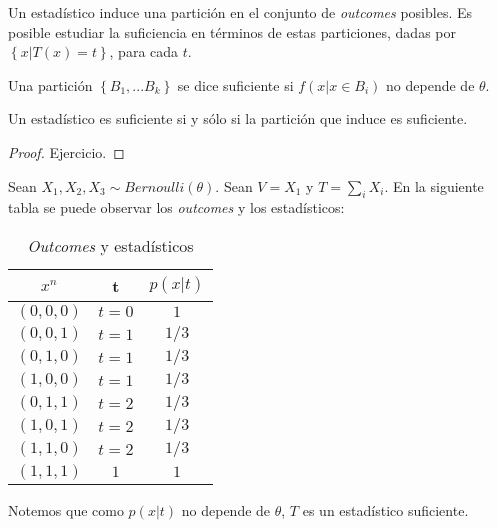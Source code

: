 Un estadístico induce una partición en el conjunto de \emph{outcomes}  posibles. Es posible estudiar la suficiencia en términos de estas particiones, dadas por $\left \{ x | T(x) = t \right  \}$, para cada $ t $. 

\begin{definition}
    Una partición $ \left \{ B_1,...B_k \right \}$ se dice suficiente si $f(x | x \in B_i) $ no depende de $\theta$. 
\end{definition}
\begin{theorem}
    Un estadístico es suficiente si y sólo si la partición que induce es suficiente.
\end{theorem}
\begin{proof}
Ejercicio. 
\end{proof}

\begin{example}
Sean $X_1,X_2, X_3\sim Bernoulli(\theta)$. Sean $V=X_1$ y $T= \sum_{i} X_i$. En la siguiente tabla se puede observar los \emph{outcomes} y los estadísticos: 
\newpage
\begin{table}[h]
    \centering
    \begin{tabular}{c  c  c}  
        $x^{n} $  & t  & $ p(x|t) $\\ \hline
        $ (0,0,0) $ & $t=0$ & $1$ \\  \hline
       $ (0,0,1) $ & $t= 1$ & $1/3$   \\
        $ (0,1,0) $ & $t=1$ & $1/3$ \\
        $ (1,0,0) $  & $t=1$ & $1/3$ \\ \hline 
        $ (0,1,1) $ & $t=2$ & $1/3$   \\
        $ (1,0,1) $ & $t=2$ & $1/3$ \\
        $ (1,1,0) $  & $t=2$ & $1/3$ \\ \hline 
        $ (1,1,1) $ & $1$ & $1$ \\
        
        
    \end{tabular}
    \caption{\emph{Outcomes} y estadísticos  }
    \label{tab: Part.Bernoulli suficiente}
\end{table}
Notemos que como $p(x | t )$ no depende de $\theta$, $T$ es un estadístico suficiente. 
\end{example}


